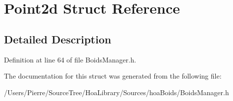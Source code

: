 \hypertarget{struct_point2d}{\section{Point2d Struct Reference}
\label{struct_point2d}
}


\subsection{Detailed Description}


Definition at line 64 of file Boids\-Manager.\-h.



The documentation for this struct was generated from the following file\-:\begin{DoxyCompactItemize}
\item 
/\-Users/\-Pierre/\-Source\-Tree/\-Hoa\-Library/\-Sources/hoa\-Boids/Boids\-Manager.\-h\end{DoxyCompactItemize}
